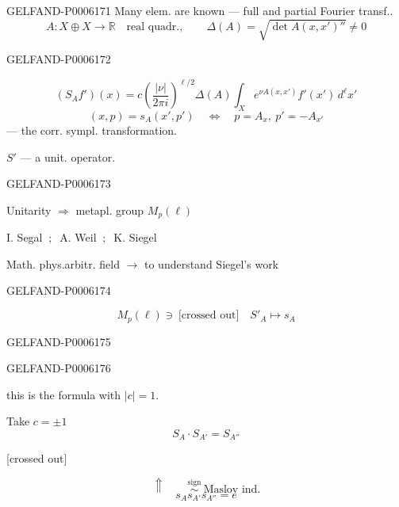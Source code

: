 \begin{GelfandAdjacentEvidence}{GELFAND-P000617}{1}
Many elem. are known — full and partial Fourier transf..
\[
A:X\oplus X\longrightarrow\mathbb R\quad\text{real quadr.},
\qquad \Delta(A)=\sqrt{\det A(x,x')''}\ne0
\]
\end{GelfandAdjacentEvidence}
\begin{GelfandAdjacentEvidence}{GELFAND-P000617}{2}

\[
(S_Af')(x)=c\left(\frac{|\nu|}{2\pi i}\right)^{\ell/2}\Delta(A)
\int_Xe^{\nu A(x,x')}f'(x')\,d^\ell x'
\]
\[
(x,p)=s_A(x',p')\quad\Leftrightarrow\quad p=A_x,\ p'=-A_{x'}
\]
— the corr. sympl. transformation.

\(S'\) — a unit. operator.
\end{GelfandAdjacentEvidence}
\begin{GelfandAdjacentEvidence}{GELFAND-P000617}{3}

Unitarity \(\Rightarrow\) metapl. group \(M_p(\ell)\)

I. Segal \(\ ;\ \) A. Weil \(\ ;\ \) K. Siegel

Math. phys.\qquad arbitr. field \(\longrightarrow\) to understand Siegel’s work
\end{GelfandAdjacentEvidence}
\begin{GelfandAdjacentEvidence}{GELFAND-P000617}{4}


\[
M_p(\ell)\ni\ \text{[crossed out]}\quad S'_A\longmapsto s_A
\]
\end{GelfandAdjacentEvidence}
\begin{GelfandAdjacentEvidence}{GELFAND-P000617}{5}

\end{GelfandAdjacentEvidence}
\begin{GelfandAdjacentEvidence}{GELFAND-P000617}{6}

this is the formula with \(|c|=1\).

Take \(c=\pm1\)
\[
S_A\cdot S_{A'}=S_{A''}
\]
\begin{center}
[crossed out]\quad{}
\end{center}
\[
\Uparrow\qquad \overset{\text{sign}}{\sim}\ \text{Maslov ind.}
\]
\[
s_A s_{A'} s_{A''}=e
\]
\end{GelfandAdjacentEvidence}

